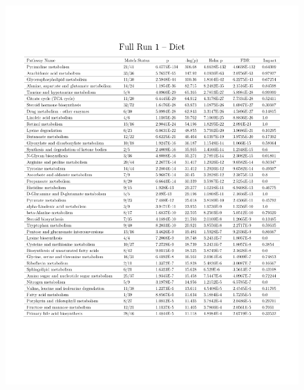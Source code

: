 \documentclass[a4paper,11pt,twoside]{book}
\begin{document}
\begin{subappendices}
\begin{figure}
	\centering
	\includegraphics[width=\linewidth]{3.Metabolomics/MSEA_charts_2.pdf}
\end{figure}


\end{subappendices}
\end{document}
